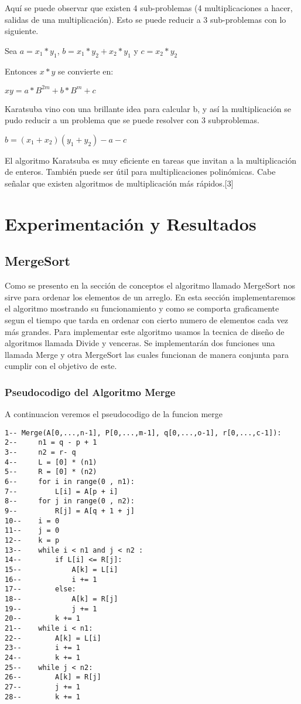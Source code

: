 \documentclass[12pt,twoside]{article}
\begin{document}
Aquí se puede observar que existen 4 sub-problemas (4 multiplicaciones a hacer, salidas de una multiplicación). Esto se puede reducir a 3 sub-problemas con lo siguiente.
\begin{center}
    Sea $a = x_1*y_1$, $b = x_1*y_2+x_2*y_1$ y $c=x_2*y_2$
\end{center}
Entonces $x*y$ se convierte en:
\begin{center}
    $xy = a*B^{2m} + b*B^m + c$
\end{center}
Karatsuba vino con una brillante idea para calcular b, y así la multiplicación se pudo reducir a un problema que se puede resolver con 3 subproblemas.
\begin{center}
    $b = (x_1+x_2)(y_1+y_2)-a-c$
\end{center}
El algoritmo Karatsuba es muy eficiente en tareas que invitan a la multiplicación de enteros. También puede ser útil para multiplicaciones polinómicas. Cabe señalar que existen algoritmos de multiplicación más rápidos.[3]
\section{Experimentaci\'on y Resultados}
\subsection{MergeSort}
Como se presento en la secci\'on de conceptos el algoritmo llamado MergeSort nos sirve para ordenar los elementos de un arreglo. En esta secci\'on implementaremos el algoritmo mostrando su funcionamiento y como se comporta graficamente segun el tiempo que tarda en ordenar con cierto numero de elementos cada vez m\'as grandes.
Para implementar este algoritmo usamos la tecnica de diseño de algoritmos llamada Divide y venceras. Se implementar\'an dos funciones una llamada Merge y otra MergeSort las cuales funcionan de manera conjunta para cumplir con el objetivo de este.
\subsubsection{Pseudocodigo del Algoritmo Merge}
A continuacion veremos el pseudocodigo de la funcion merge
\begin{lstlisting}
1-- Merge(A[0,...,n-1], P[0,...,m-1], q[0,...,o-1], r[0,...,c-1]):
2--   	n1 = q - p + 1
3--   	n2 = r- q
4--   	L = [0] * (n1)
5--   	R = [0] * (n2)
6--   	for i in range(0 , n1):
7--   		L[i] = A[p + i]
8--   	for j in range(0 , n2):
9--   		R[j] = A[q + 1 + j]
10--   	i = 0
11--   	j = 0
12--   	k = p
13--   	while i < n1 and j < n2 :
14--   		if L[i] <= R[j]:
15--   			A[k] = L[i]
16--   			i += 1
17--   		else:
18--   			A[k] = R[j]
19--   			j += 1
20--   		k += 1
21--   	while i < n1:
22--   		A[k] = L[i]
23--   		i += 1
24--   		k += 1
25--   	while j < n2:
26--   		A[k] = R[j]
27--   		j += 1
28--   		k += 1
\end{lstlisting}
\end{document}
